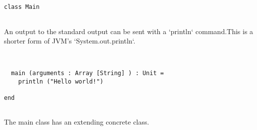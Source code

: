\documentclass[12pt,a4paper]{article}
\begin{document}
\begin{lstlisting}


class Main


\end{lstlisting}

An output to the standard output can be sent with a `println` command.This is a shorter form of JVM's `System.out.println`. 


\begin{lstlisting}


  main (arguments : Array [String] ) : Unit =
    println ("Hello world!")

end


\end{lstlisting}

The main class has an extending concrete class. 


\begin{lstlisting}


\end{lstlisting}
\end{document}

